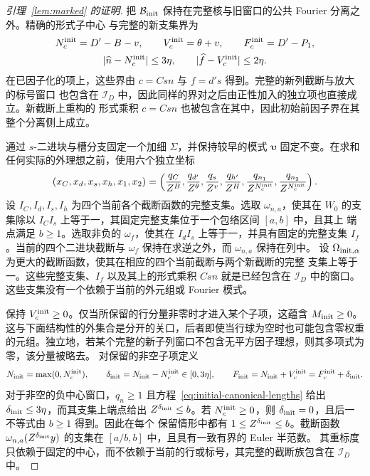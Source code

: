 \documentclass[11pt,a4paper]{article}
\numberwithin{equation}{section}
\numberwithin{figure}{section}
\theoremstyle{definition}
\theoremstyle{remark}
\begin{document}
\begin{proof}[引理~\ref{lem:marked} 的证明]
把 \(\mathcal B_{\rm init}\) 保持在完整核与旧窗口的公共 Fourier 分离之外。精确的形式子中心
与完整的新支集界为
\begin{equation}\label{eq:initial-canonical-lengths}
 \begin{gathered}
 N_c^{\rm init}=D'-B-v,\qquad V_c^{\rm init}=\theta+v,\qquad
 F_c^{\rm init}=D'-P_1,\\
 |\widehat n-N_c^{\rm init}|\le3\eta,\qquad
 |\widehat f-V_c^{\rm init}|\le2\eta.
 \end{gathered}
\end{equation}
在已因子化的项上，这些界由 \(c=Csn\) 与 \(f=d's\) 得到。完整的新列截断与放大的标号窗口
也包含在 \(\mathcal I_D\) 中，因此同样的界对之后由正性加入的独立项也直接成立。新截断上重构的
形式乘积 \(c=Csn\) 也被包含在其中，因此初始前因子界在其整个分离侧上成立。

通过 \(s\)-二进块与槽分支固定一个加细 \(\Sigma\)，并保持较早的模式 \(\boldsymbol\upsilon\)
固定不变。在求和任何实际的外理想之前，使用六个独立坐标
\[
 (x_C,x_d,x_s,x_h,x_1,x_2)
 =\left(\frac{q_C}{Z^B},\frac{q_{d'}}{Z^\theta},
 \frac{q_s}{Z^v},\frac{q_{h'}}{Z^H},
 \frac{q_{n_1}}{Z^{N_c^{\rm init}}},
 \frac{q_{n_2}}{Z^{N_c^{\rm init}}}\right).
\]
设 \(I_C,I_d,I_s,I_h\) 为四个当前各个截断函数的完整支集。选取 \(\omega_{n,a}\)，使其在
\(W_0\) 的支集除以 \(I_CI_s\) 上等于一，其固定完整支集位于一个包络区间 \([a,b]\) 中，且其上
端点满足 \(b\ge1\)。选取非负的 \(\omega_f\)，使其在 \(I_dI_s\) 上等于一，并具有固定的完整支集
\(I_f\)。当前的四个二进块截断与 \(\omega_f\) 保持在求逆之外，而 \(\omega_{n,a}\) 保持在列中。
设 \(\Omega_{{\rm init},\alpha}\) 为更大的截断函数，使其在相应的四个当前截断与两个新截断的完整
支集上等于一。这些完整支集、\(I_f\) 以及其上的形式乘积 \(Csn\) 就是已经包含在 \(\mathcal I_D\)
中的窗口。这些支集没有一个依赖于当前的外元组或 Fourier 模式。

保持 \(V_c^{\rm init}\ge0\)。仅当所保留的行分量非零时才进入某个子项，这蕴含
\(M_{\rm init}\ge0\)。这与下面结构性的外集合是分开的关口，后者即使当行球为空时也可能包含零权重
的元组。独立地，若某个完整的新子列窗口不包含无平方因子理想，则其多项式为零，该分量被略去。
对保留的非空子项定义
\[
 N_{\rm init}=\max(0,N_c^{\rm init}),\qquad
 \delta_{\rm init}=N_{\rm init}-N_c^{\rm init}\in[0,3\eta],\qquad
 F_{\rm init}=N_{\rm init}+V_c^{\rm init}=F_c^{\rm init}+\delta_{\rm init}.
\]
对于非空的负中心窗口，\(q_n\ge1\) 且方程~\eqref{eq:initial-canonical-lengths} 给出
\(\delta_{\rm init}\le3\eta\)，而其支集上端点给出 \(Z^{\delta_{\rm init}}\le b\)。若
\(N_c^{\rm init}\ge0\)，则 \(\delta_{\rm init}=0\)，且后一不等式由 \(b\ge1\) 得到。因此在每个
保留情形中都有 \(1\le Z^{\delta_{\rm init}}\le b\)。截断函数
\(\omega_{n,a}(Z^{\delta_{\rm init}}y)\) 的支集在 \([a/b,b]\) 中，且具有一致有界的 Euler 半范数。
其重标度只依赖于固定的中心，而不依赖于当前的行或标号，其完整的截断族包含在 \(\mathcal I_D\) 中。


\end{proof}
\end{document}

